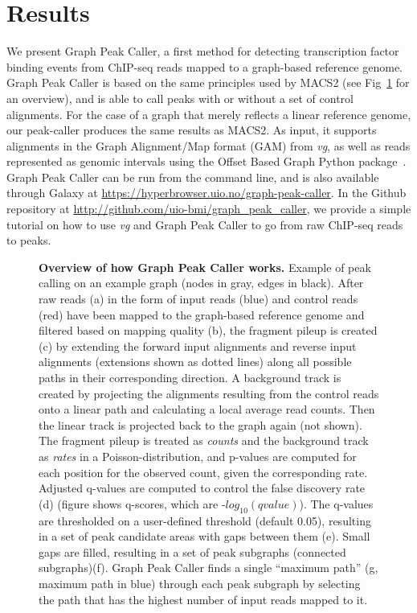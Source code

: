 \documentclass[10pt,letterpaper]{article}
\begin{document}
\section*{Results}
We present Graph Peak Caller, a first method for detecting transcription factor binding events from ChIP-seq reads mapped to a graph-based reference genome. Graph Peak Caller is based on the same principles used by MACS2 (see Fig~\ref{overview_figure} for an overview), and  is able to call peaks with or without a set of control alignments. For the case of a graph that merely reflects a linear reference genome, our peak-caller produces the same results as MACS2. As input, it supports alignments in the Graph Alignment/Map format (GAM) from \emph{vg}, as well as reads represented as genomic intervals using the Offset Based Graph Python package~\cite{rand}. Graph Peak Caller can be run from the command line, and is also available through Galaxy at \url{https://hyperbrowser.uio.no/graph-peak-caller}.
In the Github repository at \url{http://github.com/uio-bmi/graph_peak_caller}, we provide a simple tutorial on how to use \emph{vg} and Graph Peak Caller to go from raw ChIP-seq reads to peaks. 
\begin{figure}[H]
   \caption{{\bf Overview of how Graph Peak Caller works.} Example of peak calling on an example graph (nodes in gray, edges in black). After raw reads (a) in the form of input reads (blue) and control reads (red) have been mapped to the graph-based reference genome and filtered based on mapping quality (b), the fragment pileup is created (c) by extending the forward input alignments and reverse input alignments (extensions shown as dotted lines) along all possible paths in their corresponding direction.
     A background track is created by projecting the alignments resulting from the control reads onto a linear path and calculating a local average read counts.
     Then the linear track is projected back to the graph again (not shown).
     The fragment pileup is treated as \emph{counts} and the background track as \emph{rates} in a Poisson-distribution, and p-values are computed for each position for the observed count, given the corresponding rate.
     Adjusted q-values are computed to control the false discovery rate (d) (figure shows q-scores, which are -$log_{10}(qvalue)$). The q-values are thresholded on a user-defined threshold (default 0.05), resulting in a set of peak candidate areas with gaps between them (e). Small gaps are filled, resulting in a set of peak subgraphs (connected subgraphs)(f). Graph Peak Caller finds a single “maximum path” (g, maximum path in blue) through each peak subgraph by selecting the path that has the highest number of input reads mapped to it. }
   \label{overview_figure}
\end{figure}
\end{document}
